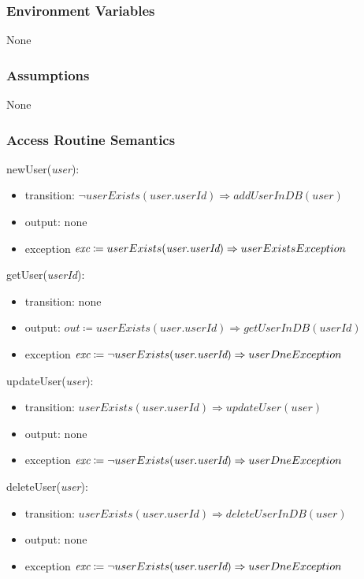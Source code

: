 \documentclass[12pt, titlepage]{article}
\begin{document}
\subsubsection{Environment Variables}
None

\subsubsection{Assumptions}
None

\subsubsection{Access Routine Semantics}

\noindent newUser(\textit{user}):
\begin{itemize}
\item transition: \( \neg userExists(\textit{user.userId}) \Rightarrow addUserInDB(\textit{user})\) 
\item output: none
\item exception \( \textit{exc} \coloneqq userExists(\textit{user.userId}) \Rightarrow \\ userExistsException\)
\end{itemize}

\noindent getUser(\textit{userId}):
\begin{itemize}
\item transition: none
\item output: \( \textit{out} \coloneqq userExists(\textit{user.userId}) \Rightarrow getUserInDB(userId)\)
\item exception \( \textit{exc} \coloneqq \neg userExists(\textit{user.userId}) \Rightarrow \\ userDneException\)
\end{itemize}

\noindent updateUser(\textit{user}):
\begin{itemize}
\item transition: \( userExists(\textit{user.userId}) \Rightarrow updateUser(\textit{user})\)
\item output: none
\item exception \( \textit{exc} \coloneqq \neg userExists(\textit{user.userId}) \Rightarrow \\ userDneException\)
\end{itemize}

\noindent deleteUser(\textit{user}):
\begin{itemize}
\item transition: \( userExists(\textit{user.userId}) \Rightarrow deleteUserInDB(\textit{user})\) 
\item output: none
\item exception \( \textit{exc} \coloneqq \neg userExists(\textit{user.userId}) \Rightarrow \\ userDneException\)
\end{itemize}
\end{document}
